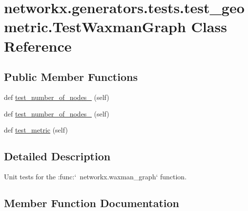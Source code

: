 \hypertarget{classnetworkx_1_1generators_1_1tests_1_1test__geometric_1_1TestWaxmanGraph}{}\section{networkx.\+generators.\+tests.\+test\+\_\+geometric.\+Test\+Waxman\+Graph Class Reference}
\label{classnetworkx_1_1generators_1_1tests_1_1test__geometric_1_1TestWaxmanGraph}
\subsection*{Public Member Functions}
\begin{DoxyCompactItemize}
\item 
def \hyperlink{classnetworkx_1_1generators_1_1tests_1_1test__geometric_1_1TestWaxmanGraph_ab7bf643b3495cc945cf14c42a0a0a0d0}{test\+\_\+number\+\_\+of\+\_\+nodes\+\_} (self)
\item 
def \hyperlink{classnetworkx_1_1generators_1_1tests_1_1test__geometric_1_1TestWaxmanGraph_adb08f6224811b8b114adbbab9687c118}{test\+\_\+number\+\_\+of\+\_\+nodes\+\_} (self)
\item 
def \hyperlink{classnetworkx_1_1generators_1_1tests_1_1test__geometric_1_1TestWaxmanGraph_a4725e0d05e57b9f180cee6c4b42142b8}{test\+\_\+metric} (self)
\end{DoxyCompactItemize}


\subsection{Detailed Description}
\begin{DoxyVerb}Unit tests for the :func:`~networkx.waxman_graph` function.\end{DoxyVerb}
 

\subsection{Member Function Documentation}
\mbox{\label{classnetworkx_1_1generators_1_1tests_1_1test__geometric_1_1TestWaxmanGraph_a4725e0d05e57b9f180cee6c4b42142b8}} 
